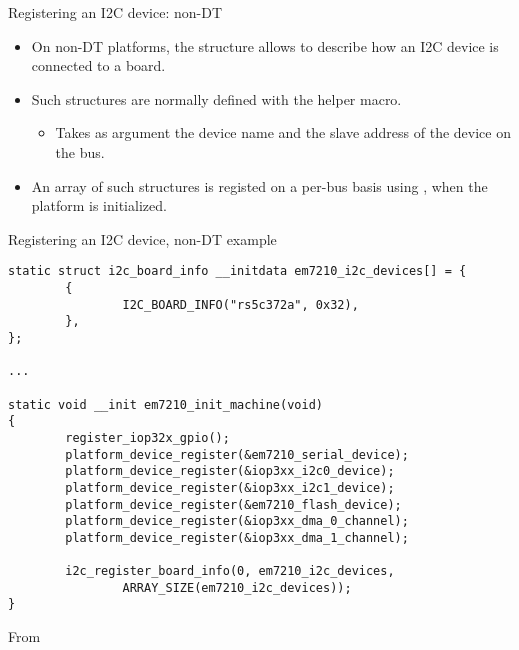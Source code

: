 \begin{frame}{Registering an I2C device: non-DT}
  \begin{itemize}
  \item On non-DT platforms, the  structure
    allows to describe how an I2C device is connected to a board.
  \item Such structures are normally defined with the
     helper macro.
    \begin{itemize}
    \item Takes as argument the device name and the slave address of
      the device on the bus.
    \end{itemize}
  \item An array of such structures is registed on a per-bus basis
    using , when the platform is
    initialized.
  \end{itemize}
\end{frame}

\begin{frame}[fragile]{Registering an I2C device, non-DT example}
  \begin{block}{}
    \begin{verbatim}
static struct i2c_board_info __initdata em7210_i2c_devices[] = {
        {
                I2C_BOARD_INFO("rs5c372a", 0x32),
        },
};

...

static void __init em7210_init_machine(void)
{
        register_iop32x_gpio();
        platform_device_register(&em7210_serial_device);
        platform_device_register(&iop3xx_i2c0_device);
        platform_device_register(&iop3xx_i2c1_device);
        platform_device_register(&em7210_flash_device);
        platform_device_register(&iop3xx_dma_0_channel);
        platform_device_register(&iop3xx_dma_1_channel);

        i2c_register_board_info(0, em7210_i2c_devices,
                ARRAY_SIZE(em7210_i2c_devices));
}
    \end{verbatim}
  \end{block}
  From 
\end{frame}

